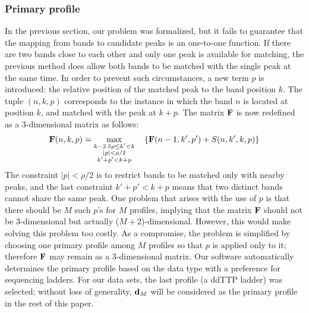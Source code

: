 \subsubsection{Primary profile}\label{sss:primary_profile}
In the previous section, our problem was formalized, but it fails to guarantee that the mapping from bands to candidate peaks is an one-to-one function. If there are two bands close to each other and only one peak is available for matching, the previous method does allow both bands to be matched with the single peak at the same time. In order to prevent such circumstances, a new term $p$ is introduced: the relative position of the matched peak to the band position $k$. The tuple $(n,k,p)$ corresponds to the instance in which the band $n$ is located at position $k$, and matched with the peak at $k+p$. The matrix ${\mathbf{F}}$ is now redefined as a 3-dimensional matrix as follows:
%
\begin{equation}\label{e:F2}
{\mathbf{F}}(n,k,p) = \max_{\substack{k-2.5\rho \le k' < k\\|p| < \rho/2\\k'+p' < k+p}}\quad \left\{ {\mathbf{F}}(n-1,k',p') + S(n,k',k,p) \right\}
\end{equation}
%
The constraint $|p| < \rho/2$ is to restrict bands to be matched only with nearby peaks, and the last constraint $k'+p'<k+p$ means that two distinct bands cannot share the same peak. One problem that arises with the use of $p$ is that there should be $M$ such $p$'s for $M$ profiles, implying that the matrix ${\mathbf{F}}$ should not be 3-dimensional but actually ($M+2$)-dimensional. However, this would make solving this problem too costly. As a compromise, the problem is simplified by choosing one primary profile among $M$ profiles so that $p$ is applied only to it; therefore ${\mathbf{F}}$ may remain as a 3-dimensional matrix. Our software automatically determines the primary profile based on the data type with a preference for sequencing ladders. For our data sets, the last profile (a ddTTP ladder) was selected; without loss of generality, ${\mathbf{d}}_M$ will be considered as the primary profile in the rest of this paper.

